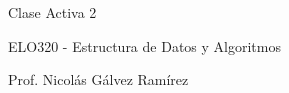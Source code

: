 \documentclass{article}
\begin{document}
\vspace{.5pc}
\centerline{\sc Clase Activa 2}
\centerline{\sc ELO320 - Estructura de Datos y Algoritmos}
\centerline{\sc Prof. Nicolás Gálvez Ramírez}
\vspace{2pc}
\end{document}
